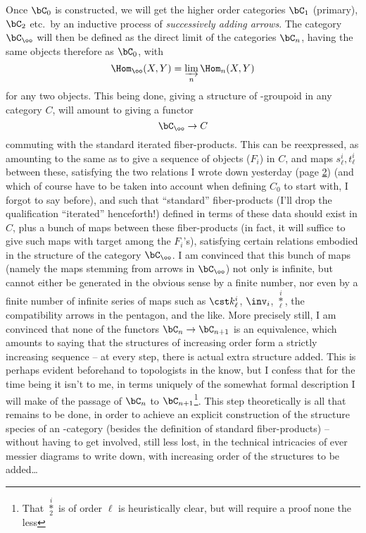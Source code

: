 Once $\bC_0$ is constructed, we will get the higher order
categories $\bC_1$ (primary), $\bC_2$ etc.\ by an inductive
process of \emph{successively adding arrows}. The category $\bC_\oo$
will then be defined as the direct limit of the categories
$\bC_n$, having the same objects therefore as $\bC_0$, with
\[\Hom_\oo(X, Y) = \varinjlim_n \Hom_n(X, Y)\]
for any two objects. This being done, giving a structure of
\oo-groupoid in any category $C$, will amount to giving a functor
\[\bC_\oo \to C\]
commuting with the standard iterated fiber-products. This can be
reexpressed, as amounting to the same as to give a sequence of objects
($F_i$) in $C$, and maps $s_\ell^i, t_\ell^i$ between these,
satisfying the two relations I wrote down yesterday (page \hyperref[p:L.2]2) (and
which of course have to be taken into account when defining $C_0$ to
start with, I forgot to say before), and such that
``standard'' fiber-products (I'll drop the qualification ``iterated''
  henceforth!) defined in terms of these data should
exist in $C$, plus a bunch of maps between these fiber-products (in
fact, it will suffice to give such maps with target among the
$F_i$'s), satisfying certain relations embodied in the structure of
the category $\bC_\oo$. I am convinced that this bunch of maps
(namely the maps stemming from arrows in $\bC_\oo$) not only is
infinite, but cannot either be generated in the obvious
sense by a finite number, nor even by a finite number of infinite
series of maps such as $\cst k_\ell^i$, $\inv_i$,
$\overset{i}{\underset{\ell}{*}}$, the compatibility arrows in the
pentagon, and the like. More precisely still, I am convinced that none
of the functors $\bC_n \to \bC_{n+1}$ is an equivalence, which
amounts to saying that the structures of increasing order form a
strictly increasing sequence -- at every step, there is actual extra
structure added. This is perhaps evident beforehand to topologists in
the know, but I confess that for the time being it isn't to me, in
terms uniquely of the somewhat formal description I will make of the
passage of $\bC_n$ to $\bC_{n+1}$\footnote{That $\overset{i}{\underset{2}{*}}$ is of order $\ell$ is heuristically clear, but will require a proof none the less}. This step theoretically is all
that remains to be done, in order to achieve an explicit construction
of the structure species of an \oo-category (besides the definition of
standard fiber-products) -- without having to get involved, still less
lost, in the technical intricacies of ever messier diagrams to write
down, with increasing order of the structures to be added\ldots

